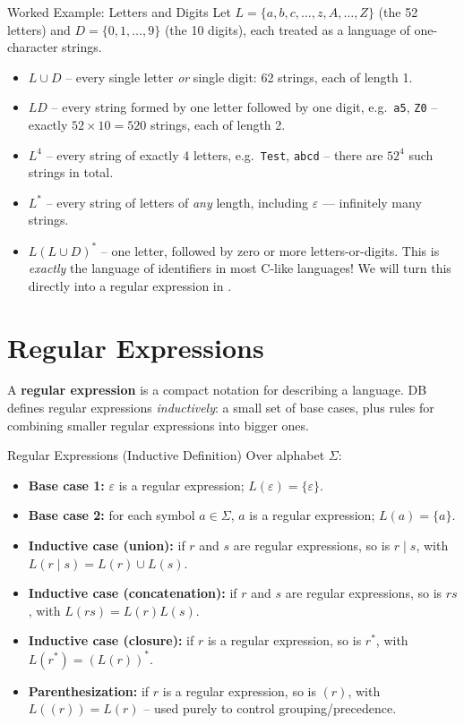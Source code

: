 \documentclass[full-course-notes.tex]{subfiles}
\begin{document}
\begin{examplebox}{Worked Example: Letters and Digits}
Let $L = \{a, b, c, \dots, z, A, \dots, Z\}$ (the 52 letters) and $D = \{0, 1, \dots, 9\}$ (the
10 digits), each treated as a language of one-character strings.
\begin{itemize}
  \item $L \cup D$ -- every single letter \emph{or} single digit: 62 strings, each of length 1.
  \item $LD$ -- every string formed by one letter followed by one digit, e.g.\ \texttt{a5},
  \texttt{Z0} -- exactly $52 \times 10 = 520$ strings, each of length 2.
  \item $L^{4}$ -- every string of exactly 4 letters, e.g.\ \texttt{Test}, \texttt{abcd} --
  there are $52^{4}$ such strings in total.
  \item $L^{*}$ -- every string of letters of \emph{any} length, including $\varepsilon$ ---
  infinitely many strings.
  \item $L(L \cup D)^{*}$ -- one letter, followed by zero or more letters-or-digits. This is
  \emph{exactly} the language of identifiers in most C-like languages! We will turn this
  directly into a regular expression in .
\end{itemize}
\end{examplebox}

\section{Regular Expressions}
\label{sec:l4-regular-expressions}

\dbtag A \textbf{regular expression} is a compact notation for describing a language. DB
defines regular expressions \emph{inductively}: a small set of base cases, plus rules for
combining smaller regular expressions into bigger ones.

\begin{defbox}{Regular Expressions (Inductive Definition)}
Over alphabet $\Sigma$:
\begin{itemize}
  \item \textbf{Base case 1:} $\varepsilon$ is a regular expression; $L(\varepsilon) = \{\varepsilon\}$.
  \item \textbf{Base case 2:} for each symbol $a \in \Sigma$, $a$ is a regular expression;
  $L(a) = \{a\}$.
  \item \textbf{Inductive case (union):} if $r$ and $s$ are regular expressions, so is
  $r \mid s$, with $L(r \mid s) = L(r) \cup L(s)$.
  \item \textbf{Inductive case (concatenation):} if $r$ and $s$ are regular expressions, so is
  $rs$, with $L(rs) = L(r)L(s)$.
  \item \textbf{Inductive case (closure):} if $r$ is a regular expression, so is $r^{*}$, with
  $L(r^{*}) = (L(r))^{*}$.
  \item \textbf{Parenthesization:} if $r$ is a regular expression, so is $(r)$, with
  $L((r)) = L(r)$ -- used purely to control grouping/precedence.
\end{itemize}
\end{defbox}
\end{document}
